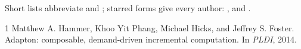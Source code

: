 \documentclass{article}
\begin{document}
Short lists abbreviate \citet{hammer14} and \citep{hammer14}; starred
forms give every author: \citet*{hammer14}, \citep*{hammer14} and
\citeauthor*{hammer14}.

\begin{thebibliography}{1}
  Matthew A. Hammer, Khoo Yit Phang, Michael Hicks, and Jeffrey S. Foster.
  Adapton: composable, demand-driven incremental computation. In \emph{PLDI},
  2014.
\end{thebibliography}
\end{document}
